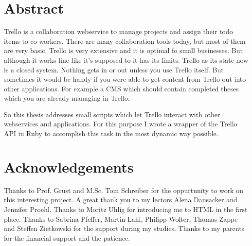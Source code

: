 \documentclass[twoside,12pt,a4paper, parskip=full-]{report}
\begin{document}

\setcounter{page}{1}



\section*{Abstract}

Trello is a collaboration webservice to manage projects and assign their todo items to co-workers. There are many collaboration tools today, but most of them are very basic. Trello is very extensive and it is optimal fo small businesses. But although it works fine like it's supposed to it has its limits. Trello as its state now is a closed system. Nothing gets in or out unless you use Trello itself. But sometimes it would be handy if you were able to get content from Trello out into other applications. For example a CMS which should contain completed theses which you are already managing in Trello.
 
So this thesis addresses small scripts which let Trello interact with other webservices and applications. For this purpose I wrote a wrapper of the Trello API in Ruby to accomplish this task in the most dynamic way possible.

\newpage

\section*{Acknowledgements}
Thanks to Prof. Grust and M.Sc. Tom Schreiber for the oppurtunity to work on this interesting project. A great thank you to my lectors Alena Dausacker and Jennifer Proehl. Thanks to Moritz Uhlig for introducing me to HTML in the first place. Thanks to Sabrina Pfeffer, Martin Lahl, Philipp Wolter, Thomas Zappe and Steffen Zietkowski for the support during my studies. Thanks to my parents for the financial support and the patience.

\cleardoublepage


\renewcommand{\baselinestretch}{1.3}
\small\normalsize
\end{document}
